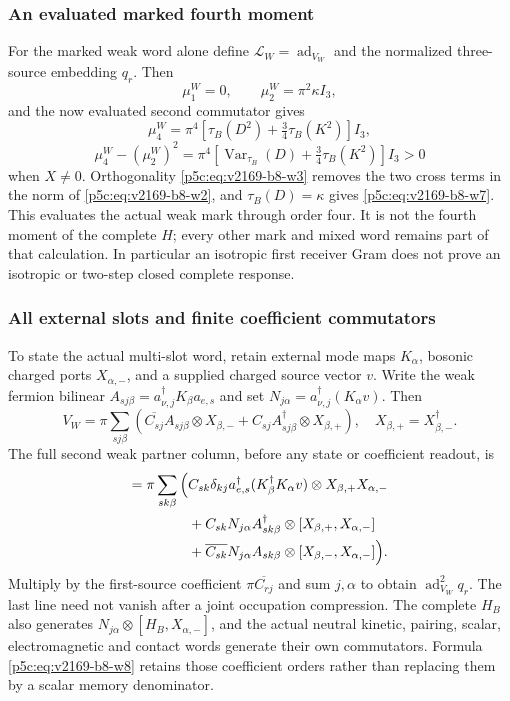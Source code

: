 \documentclass[12pt,a4paper]{article}
\begin{document}
\subsubsection{An evaluated marked fourth moment}
For the marked weak word alone define $\mathcal L_W=\operatorname{ad}_{V_W}$ and the
normalized three-source embedding $q_r$. Then
\[
 \mu_1^W=0,\qquad \mu_2^W=\pi^2\kappa I_3,
\]
and the now evaluated second commutator gives
\begin{equation}
 \boxed{\mu_4^W=\pi^4
       \left[\tau_B(D^2)+\tfrac34\tau_B(K^2)\right]I_3,}
 \label{p5c:eq:v2169-b8-w6}
\end{equation}
\begin{equation}
 \boxed{\mu_4^W-(\mu_2^W)^2=\pi^4
       \left[\operatorname{Var}_{\tau_B}(D)
                    +\tfrac34\tau_B(K^2)\right]I_3>0}
 \label{p5c:eq:v2169-b8-w7}
\end{equation}
when $X\ne0$. Orthogonality \eqref{p5c:eq:v2169-b8-w3} removes the two cross terms in the
norm of \eqref{p5c:eq:v2169-b8-w2}, and $\tau_B(D)=\kappa$ gives \eqref{p5c:eq:v2169-b8-w7}.
This evaluates the actual weak mark through order four. It is not the
fourth moment of the complete $H$; every other mark and mixed word remains
part of that calculation. In particular an isotropic first receiver Gram
does not prove an isotropic or two-step closed complete response.

\subsubsection{All external slots and finite coefficient commutators}
To state the actual multi-slot word, retain external mode maps $K_\alpha$,
bosonic charged ports $X_{\alpha,-}$, and a supplied charged source vector
$v$. Write the weak fermion bilinear
$A_{sj\beta}=a_{\nu,j}^\dagger K_\beta a_{e,s}$ and set
$N_{j\alpha}=a_{\nu,j}^\dagger(K_\alpha v)$. Then
\[
 V_W=\pi\sum_{sj\beta}
  \left(\overline{C_{sj}}A_{sj\beta}\otimes X_{\beta,-}
                +C_{sj}A_{sj\beta}^\dagger\otimes X_{\beta,+}\right),
 \quad X_{\beta,+}=X_{\beta,-}^\dagger.
\]
The full second weak partner column, before any state or coefficient readout,
is
\begin{align}
 [V_W,N_{j\alpha}\otimes X_{\alpha,-}]
 =\pi\sum_{sk\beta}\Big(&C_{sk}\delta_{kj}
 a_{e,s}^\dagger(K_\beta^\dagger K_\alpha v)
                   \otimes X_{\beta,+}X_{\alpha,-}\notag\\
 &+C_{sk}N_{j\alpha}A_{sk\beta}^\dagger
                   \otimes[X_{\beta,+},X_{\alpha,-}]\notag\\
 &+\overline{C_{sk}}N_{j\alpha}A_{sk\beta}
                   \otimes[X_{\beta,-},X_{\alpha,-}]\Big).
 \label{p5c:eq:v2169-b8-w8}
\end{align}
Multiply by the first-source coefficient
$\pi\overline{C_{rj}}$ and sum $j,\alpha$ to obtain
$\operatorname{ad}_{V_W}^2q_r$. The last line need not vanish after a joint occupation
compression. The complete $H_B$ also generates
$N_{j\alpha}\otimes[H_B,X_{\alpha,-}]$, and the actual neutral kinetic,
pairing, scalar, electromagnetic and contact words generate their own
commutators. Formula \eqref{p5c:eq:v2169-b8-w8} retains those coefficient orders rather than
replacing them by a scalar memory denominator.
\end{document}
